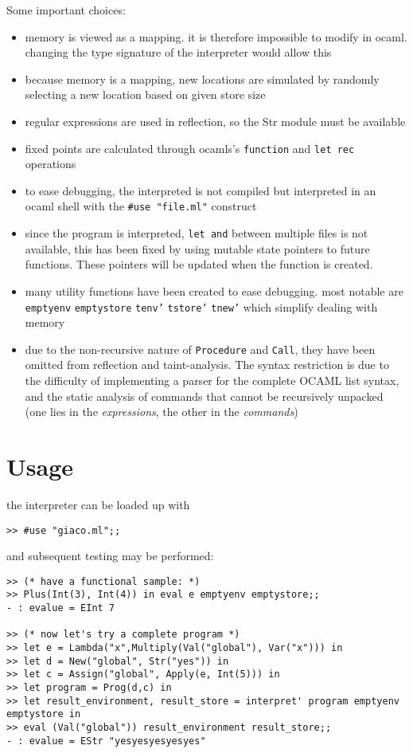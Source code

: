 \documentclass[11pt]{article}
\begin{document}
Some important choices:
\begin{itemize}
\item memory is viewed as a mapping. it is therefore impossible to modify in ocaml. changing the type signature of the interpreter would allow this
\item because memory is a mapping, new locations are simulated by randomly selecting a new location based on given store size
\item regular expressions are used in reflection, so the Str module must be available
\item fixed points are calculated through ocamls's \texttt{function} and \texttt{let rec} operations
\item to ease debugging, the interpreted is not compiled but interpreted in an ocaml shell with the \texttt{\#use "file.ml"} construct
\item since the program is interpreted, \texttt{let and} between multiple files is not available, this has been fixed by using mutable state pointers to future functions. These pointers will be updated
when the function is created.
\item many utility functions have been created to ease debugging. most notable are \texttt{emptyenv} \texttt{emptystore} \texttt{tenv'} \texttt{tstore'} \texttt{tnew'} which simplify dealing with memory
\item due to the non-recursive nature of \texttt{Procedure} and \texttt{Call}, they have been omitted from reflection and taint-analysis. The syntax restriction is due to the difficulty of implementing a parser 
for the complete OCAML list syntax, and the static analysis of commands that cannot be recursively unpacked (one lies in the \emph{expressions}, the other in the \emph{commands})
\end{itemize}
\section{Usage}
\label{sec:orgb7e2378}
the interpreter can be loaded up with
\begin{verbatim}
>> #use "giaco.ml";;
\end{verbatim}

and subsequent testing may be performed:
\begin{verbatim}
>> (* have a functional sample: *)
>> Plus(Int(3), Int(4)) in eval e emptyenv emptystore;;
- : evalue = EInt 7

>> (* now let's try a complete program *)
>> let e = Lambda("x",Multiply(Val("global"), Var("x"))) in
>> let d = New("global", Str("yes")) in
>> let c = Assign("global", Apply(e, Int(5))) in
>> let program = Prog(d,c) in
>> let result_environment, result_store = interpret' program emptyenv emptystore in
>> eval (Val("global")) result_environment result_store;;
- : evalue = EStr "yesyesyesyesyes"
\end{verbatim}
\end{document}
